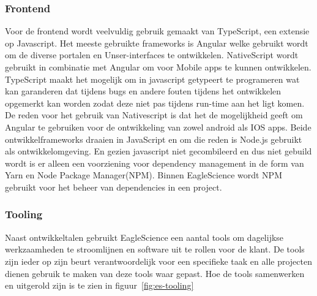 \subsubsection{Frontend}
Voor de frontend wordt veelvuldig gebruik gemaakt van TypeScript, een extensie op Javascript. Het meeste gebruikte frameworks is Angular welke gebruikt wordt om de diverse portalen en Unser-interfaces te ontwikkelen. NativeScript wordt gebruikt in combinatie met Angular om voor Mobile apps te kunnen ontwikkelen. TypeScript maakt het mogelijk om in javascript getypeert te programeren wat kan garanderen dat tijdens bugs en andere fouten tijdens het ontwikkelen opgemerkt kan worden zodat deze niet pas tijdens run-time aan het ligt komen. De reden voor het gebruik van Nativescript is dat het de mogelijkheid geeft om Angular te gebruiken voor de ontwikkeling van zowel android als IOS apps.  Beide ontwikkelframeworks draaien in JavaScript en om die reden is Node.js gebruikt als ontwikkelomgeving. En gezien javascript niet gecombileerd en dus niet gebuild wordt is er alleen een voorziening voor dependency management in de form van Yarn en Node Package Manager(NPM). Binnen EagleScience wordt NPM
gebruikt voor het beheer van dependencies in een project.


\subsubsection{Tooling}\label{subsec:tooling}
Naast ontwikkeltalen gebruikt EagleScience een aantal tools om dagelijkse werkzaamheden te stroomlijnen en software uit te rollen voor de klant. De tools zijn ieder op zijn beurt verantwoordelijk voor een specifieke taak en alle projecten dienen gebruik te maken van deze tools waar gepast. Hoe de tools samenwerken en uitgerold zijn is te zien in figuur~\ref{fig:es-tooling}


